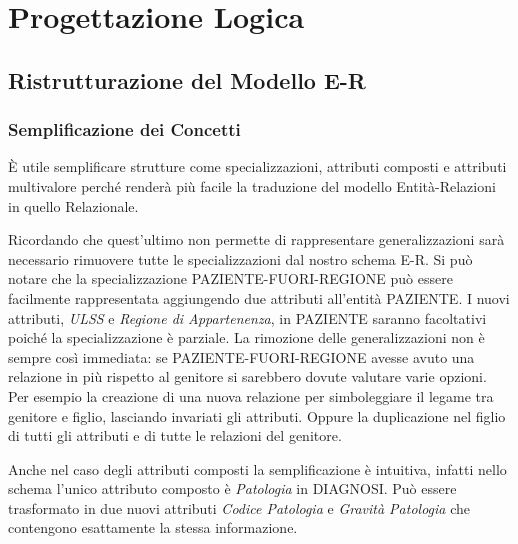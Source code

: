 \documentclass{article}
\begin{document}




\clearpage
\section{Progettazione Logica}


\subsection{Ristrutturazione del Modello E-R}
\subsubsection{Semplificazione dei Concetti}

È utile semplificare strutture come specializzazioni, attributi composti e attributi multivalore perché renderà più facile la traduzione del modello Entità-Relazioni in quello Relazionale.

Ricordando che quest'ultimo non permette di rappresentare generalizzazioni sarà necessario rimuovere tutte le specializzazioni dal nostro schema E-R.
Si può notare che la specializzazione PAZIENTE-FUORI-REGIONE può essere facilmente rappresentata aggiungendo due attributi all'entità PAZIENTE.
I nuovi attributi, \textit{ULSS} e \textit{Regione di Appartenenza}, in PAZIENTE saranno facoltativi poiché la specializzazione è parziale.
La rimozione delle generalizzazioni non è sempre così immediata: se PAZIENTE-FUORI-REGIONE avesse avuto una relazione in più rispetto al genitore si sarebbero dovute valutare varie opzioni.
Per esempio la creazione di una nuova relazione per simboleggiare il legame tra genitore e figlio, lasciando invariati gli attributi.
Oppure la duplicazione nel figlio di tutti gli attributi e di tutte le relazioni del genitore.

Anche nel caso degli attributi composti la semplificazione è intuitiva, infatti nello schema l'unico attributo composto è \textit{Patologia} in DIAGNOSI.
Può essere trasformato in due nuovi attributi \textit{Codice Patologia} e \textit{Gravità Patologia} che contengono esattamente la stessa informazione.
\end{document}
